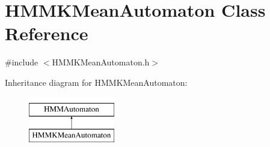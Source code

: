 \hypertarget{class_h_m_m_k_mean_automaton}{\section{H\+M\+M\+K\+Mean\+Automaton Class Reference}
\label{class_h_m_m_k_mean_automaton}
}


{\ttfamily \#include $<$H\+M\+M\+K\+Mean\+Automaton.\+h$>$}

Inheritance diagram for H\+M\+M\+K\+Mean\+Automaton\+:\begin{figure}[H]
\begin{center}
\leavevmode
\includegraphics[height=2.000000cm]{class_h_m_m_k_mean_automaton}
\end{center}
\end{figure}
